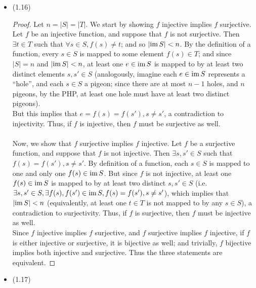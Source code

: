 \documentclass{homework}
\begin{document}
\begin{solution}
  \begin{itemize}
    \item (1.16)
      \begin{proof}[Proof]
        Let $n=\left| S \right| =\left| T \right| $. We start by showing $f$ injective implies $f$
        surjective. Let $f$ be an injective function, and suppose that $f$ is not surjective. Then
        $\exists t\in T$ such that $\forall s \in S, f(s)\neq t$; and so $\left|\operatorname{im} S\right|<n$.
        By the definition of a function, every $s \in S$ is mapped to some element $f(s)\in T$; and
        since $\left| S \right| = n$ and $\left| \operatorname{im} S\right|<n$, at least one $e\in \operatorname{im} S$ is
        mapped to by at least two distinct elements $s,s'\in S$ (analogously, imagine each $e\in \operatorname{im}
        S$ represents a ``hole'', and each $s \in S$ a pigeon; since there are at most $n-1$ holes,
        and $n$ pigeons, by the PHP, at least one hole must have at least two distinct pigeons). \\
        But this implies that $e=f(s)=f(s'), s\neq s'$, a contradiction to injectivity. Thus, if $f$
        is injective, then $f$ must be surjective as well.
        \\ \\
        Now, we show that $f$ surjective implies $f$ injective. Let $f$ be a surjective function, 
        and suppose that $f$ is not injective. Then $ \exists s,s'\in S$ such that $f(s)=f(s'),
        s\neq s'$. By definition of a function, each $s \in S$ is mapped to one and only one
        $f(s)\in \operatorname{im} S$. But since $f$ is not injective, at least one $f(s) \in \operatorname{im} S$ is
        mapped to by at least two distinct $s,s'\in S$ (i.e. $\exists s,s'\in S, \exists
        f(s),f(s')\in \operatorname{im} S, f(s)=f(s'), s\neq s'$), which implies that $\left| \operatorname{im} S \right|
        < n$ (equivalently, at least one $t\in T$ is not mapped to by any $s \in S$), a contradiction
        to surjectivity. Thus, if $f$ is surjective, then $f$ must be injective as well.
        \\
        Since $f$ injective implies $f$ surjective, and $f$ surjective implies $f$ injective, if
        $f$ is either injective or surjective, it is bijective as well; and trivially, $f$ bijective
        implies both injective and surjective. Thus the three statements are equivalent.
      \end{proof}
    \item (1.17)
      \begin{itemize}

\end{itemize}
\end{itemize}
\end{solution}
\end{document}
